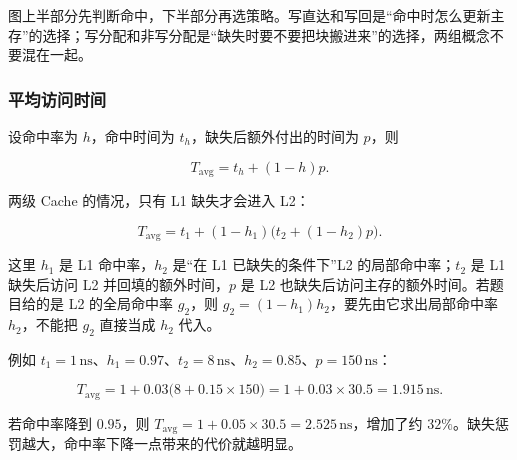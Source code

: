 图上半部分先判断命中，下半部分再选策略。写直达和写回是“命中时怎么更新主存”的选择；写分配和非写分配是“缺失时要不要把块搬进来”的选择，两组概念不要混在一起。

\subsubsection*{平均访问时间}

设命中率为 \(h\)，命中时间为 \(t_h\)，缺失后额外付出的时间为 \(p\)，则

\[
T_{\mathrm{avg}}=t_h+(1-h)p .
\]

两级 Cache 的情况，只有 L1 缺失才会进入 L2：

\[
T_{\mathrm{avg}}=t_1+(1-h_1)\bigl(t_2+(1-h_2)p\bigr).
\]

这里 \(h_1\) 是 L1 命中率，\(h_2\) 是“在 L1 已缺失的条件下”L2 的局部命中率；\(t_2\) 是 L1 缺失后访问 L2 并回填的额外时间，\(p\) 是 L2 也缺失后访问主存的额外时间。若题目给的是 L2 的全局命中率 \(g_2\)，则 \(g_2=(1-h_1)h_2\)，要先由它求出局部命中率 \(h_2\)，不能把 \(g_2\) 直接当成 \(h_2\) 代入。

例如 \(t_1=1\,\mathrm{ns}\)、\(h_1=0.97\)、\(t_2=8\,\mathrm{ns}\)、\(h_2=0.85\)、\(p=150\,\mathrm{ns}\)：

\[
T_{\mathrm{avg}}=1+0.03\bigl(8+0.15\times150\bigr)
=1+0.03\times30.5=1.915\,\mathrm{ns}.
\]

若命中率降到 \(0.95\)，则 \(T_{\mathrm{avg}}=1+0.05\times30.5=2.525\,\mathrm{ns}\)，增加了约 \(32\%\)。缺失惩罚越大，命中率下降一点带来的代价就越明显。

\begin{center}
\end{center}

